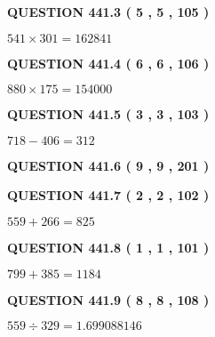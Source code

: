 \documentclass{ctexart}
\begin{document}
{\textbf{\Large{QUESTION
441.3 
 ( 5 , 5 , 105 )
}}}
  
  
 
 

$ %
541 \times  %
301=   %
162841$
 
 
  
\vspace{0.2in}
  
{\textbf{\Large{QUESTION
441.4 
 ( 6 , 6 , 106 )
}}}
  
  
 
 

$ %
880 \times  %
175=   %
154000$
 
 
  
\vspace{0.2in}
  
{\textbf{\Large{QUESTION
441.5 
 ( 3 , 3 , 103 )
}}}
  
  
 
 

$ %
718 -  %
406=   %
312$
 
 
  
\vspace{0.2in}
  
{\textbf{\Large{QUESTION
441.6 
 ( 9 , 9 , 201 )
}}}
  
  
  
\vspace{0.2in}
  
{\textbf{\Large{QUESTION
441.7 
 ( 2 , 2 , 102 )
}}}
  
  
 
 

$ %
559 +  %
266=   %
825$
 
 
  
\vspace{0.2in}
  
{\textbf{\Large{QUESTION
441.8 
 ( 1 , 1 , 101 )
}}}
  
  
 
 

$ %
799 +  %
385=   %
1184$
 
 
  
\vspace{0.2in}
  
{\textbf{\Large{QUESTION
441.9 
 ( 8 , 8 , 108 )
}}}
  
  
 
 

$ %
559 \div  %
329=   %
1.699088146$
 
 
  
\vspace{0.2in}
  
\end{document}
